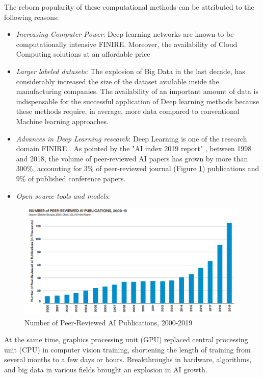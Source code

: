 The reborn popularity of these computational methods can be attributed to the following reasons:

\begin{itemize}
    \item \emph{Increasing Computer Power}: Deep learning networks are known to be computationally intensive FINIRE. 
    Moreover, the availability of Cloud Computing solutions at an affordable price
    \item \emph{Larger labeled datasets}: The explosion of Big Data in the last decade, has considerably increased the size of the dataset available inside the manufacturing companies. The availability of an important amount of data is indispensable for the successful application of Deep learning methods because these methods require, in average, more data compared to conventional Machine learning approaches. 
    \item \emph{Advances in Deep Learning research}: Deep Learning is one of the research domain FINIRE . As pointed by the "AI index 2019 report" \citep{zhang2021ai}, between 1998 and 2018, the volume of peer-reviewed AI papers has grown by more than 300\%, accounting for 3\% of peer-reviewed journal (Figure \ref{fig:Number of Peer-Reviewed AI Publications}) publications and 9\% of published conference papers.
    \item \emph{Open source tools and models}: 
\end{itemize}

\begin{figure}
\centerline{\includegraphics[scale=0.9]{images/chapter_1/AI_report.eps}}
\caption{Number of Peer-Reviewed AI Publications, 2000-2019 \citep{zhang2021ai}}
\label{fig:Number of Peer-Reviewed AI Publications}
\end{figure}

At the same time, graphics processing unit (GPU) replaced central processing unit (CPU) in computer vision training, shortening the length of training from several months to a few days or hours. Breakthroughs in hardware, algorithms, and big data in various fields brought an explosion in AI growth.



